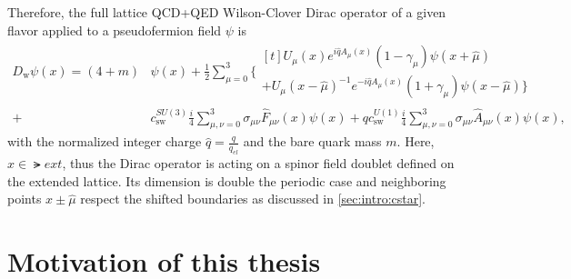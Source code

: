 Therefore, the full lattice QCD+QED Wilson-Clover Dirac operator of a given flavor applied to a pseudofermion field $\psi$ is
\begin{equation}
\begin{aligned} \label{eq:Dw:QCD+QED}
D_\mathrm{w} \psi(x) = \left( 4 + m \right) &\psi(x) + \frac{1}{2} \sum_{\mu=0}^3
\Big\{
  \begin{multlined}[t]
    U_{\mu}(x)e^{i \hat{q} A_{\mu}(x)} (1-\gamma_{\mu}) \psi(x + \hat{\mu}) \\
   +U_{\mu}(x-\hat{\mu})^{-1}e^{-i \hat{q} A_{\mu}(x) } (1+\gamma_{\mu}) \psi(x-\hat{\mu})
\Big\} \end{multlined} \\
+&c_\mathrm{sw}^{SU(3)} \frac{i}{4} \sum_{\mu,\nu=0}^3 \sigma_{\mu \nu} \hat{F}_{\mu \nu}(x) \psi(x)
+q c_\mathrm{sw}^{U(1)} \frac{i}{4} \sum_{\mu,\nu=0}^3 \sigma_{\mu \nu} \hat{A}_{\mu \nu}(x) \psi(x),
\end{aligned}
\end{equation}
with the normalized integer charge $\hat{q} = \frac{q}{q_{el}}$ and the bare quark mass $m$.
Here, $x \in \lat{ext}$, thus the Dirac operator is acting on a spinor field doublet defined on the extended lattice.
Its dimension is double the periodic case and neighboring points $x \pm \hat{\mu}$ respect the shifted boundaries as discussed in \cref{sec:intro:cstar}.




























\section{Motivation of this thesis}
\label{sec:intro:motivation}


